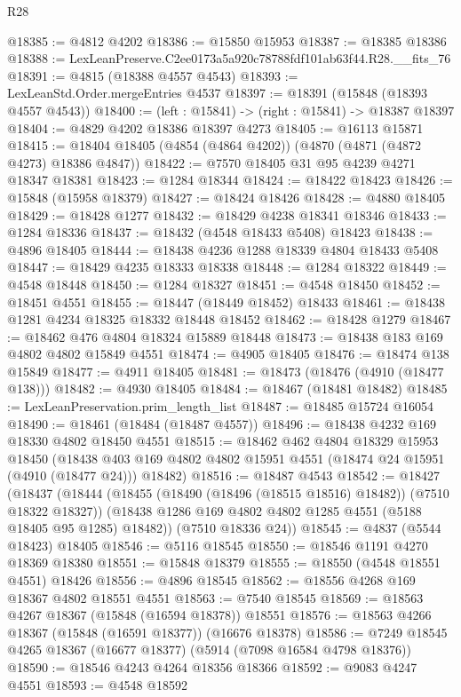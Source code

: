 \begin{lexlean}{R28}
\begin{coremodule}
@18385 := @4812 @4202
@18386 := @15850 @15953
@18387 := @18385 @18386
@18388 := LexLeanPreserve.C2ee0173a5a920c78788fdf101ab63f44.R28.__fits_76
@18391 := @4815 (@18388 @4557 @4543)
@18393 := LexLeanStd.Order.mergeEntries @4537
@18397 := @18391 (@15848 (@18393 @4557 @4543))
@18400 := (left : @15841) -> (right : @15841) -> @18387 @18397
@18404 := @4829 @4202 @18386 @18397 @4273
@18405 := @16113 @15871
@18415 := @18404 @18405 (@4854 (@4864 @4202)) (@4870 (@4871 (@4872 @4273) @18386 @4847))
@18422 := @7570 @18405 @31 @95 @4239 @4271 @18347 @18381
@18423 := @1284 @18344
@18424 := @18422 @18423
@18426 := @15848 (@15958 @18379)
@18427 := @18424 @18426
@18428 := @4880 @18405
@18429 := @18428 @1277
@18432 := @18429 @4238 @18341 @18346
@18433 := @1284 @18336
@18437 := @18432 (@4548 @18433 @5408) @18423
@18438 := @4896 @18405
@18444 := @18438 @4236 @1288 @18339 @4804 @18433 @5408
@18447 := @18429 @4235 @18333 @18338
@18448 := @1284 @18322
@18449 := @4548 @18448
@18450 := @1284 @18327
@18451 := @4548 @18450
@18452 := @18451 @4551
@18455 := @18447 (@18449 @18452) @18433
@18461 := @18438 @1281 @4234 @18325 @18332 @18448 @18452
@18462 := @18428 @1279
@18467 := @18462 @476 @4804 @18324 @15889 @18448
@18473 := @18438 @183 @169 @4802 @4802 @15849 @4551
@18474 := @4905 @18405
@18476 := @18474 @138 @15849
@18477 := @4911 @18405
@18481 := @18473 (@18476 (@4910 (@18477 @138)))
@18482 := @4930 @18405
@18484 := @18467 (@18481 @18482)
@18485 := LexLeanPreservation.prim_length_list
@18487 := @18485 @15724 @16054
@18490 := @18461 (@18484 (@18487 @4557))
@18496 := @18438 @4232 @169 @18330 @4802 @18450 @4551
@18515 := @18462
    @462
    @4804
    @18329
    @15953
    @18450
    (@18438 @403 @169 @4802 @4802 @15951 @4551 (@18474 @24 @15951 (@4910 (@18477 @24))) @18482)
@18516 := @18487 @4543
@18542 := @18427
    (@18437
      (@18444
        (@18455 (@18490 (@18496 (@18515 @18516) @18482)) (@7510 @18322 @18327))
        (@18438 @1286 @169 @4802 @4802 @1285 @4551 (@5188 @18405 @95 @1285) @18482))
      (@7510 @18336 @24))
@18545 := @4837 (@5544 @18423) @18405
@18546 := @5116 @18545
@18550 := @18546 @1191 @4270 @18369 @18380
@18551 := @15848 @18379
@18555 := @18550 (@4548 @18551 @4551) @18426
@18556 := @4896 @18545
@18562 := @18556 @4268 @169 @18367 @4802 @18551 @4551
@18563 := @7540 @18545
@18569 := @18563 @4267 @18367 (@15848 (@16594 @18378)) @18551
@18576 := @18563 @4266 @18367 (@15848 (@16591 @18377)) (@16676 @18378)
@18586 := @7249 @18545 @4265 @18367 (@16677 @18377) (@5914 (@7098 @16584 @4798 @18376))
@18590 := @18546 @4243 @4264 @18356 @18366
@18592 := @9083 @4247 @4551
@18593 := @4548 @18592

\end{coremodule}
\end{lexlean}

